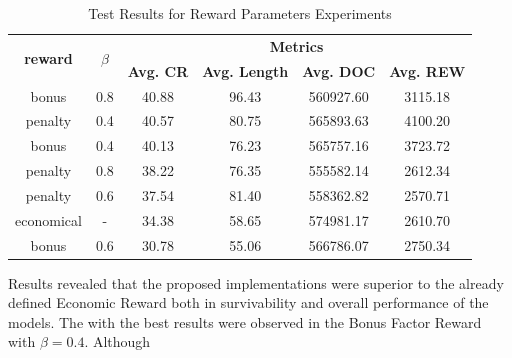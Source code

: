   \begin{table}[h!]
	\centering
	\caption{Test Results for Reward Parameters Experiments}
	\begin{tabular}{cccccc}
		\toprule
		\multirow{2}{*}{\textbf{reward}} & \multirow{2}{*}{\textbf{$\beta$}} & \multicolumn{4}{c}{\textbf{Metrics}} \\ 
		\cmidrule(lr){3-6}
		&  & \textbf{Avg. CR} & \textbf{Avg. Length} & \textbf{Avg. DOC} & \textbf{Avg. REW} \\ 
		\midrule
		bonus & 0.8 & 40.88 & 96.43 & 560927.60 & 3115.18 \\
		penalty & 0.4 & 40.57 & 80.75 & 565893.63 & 4100.20 \\
		bonus & 0.4 & 40.13 & 76.23 & 565757.16 & 3723.72  \\
		penalty & 0.8 & 38.22 & 76.35 & 555582.14 & 2612.34 \\
		penalty & 0.6 & 37.54 & 81.40 & 558362.82 & 2570.71 \\
		economical & - & 34.38 & 58.65 & 574981.17 & 2610.70 \\
		bonus & 0.6 & 30.78 & 55.06 & 566786.07 & 2750.34 \\
		\bottomrule
	\end{tabular}
	\label{tab:test-reward}
\end{table}


\par
Results revealed that the proposed implementations were superior to the already defined Economic Reward both in survivability and overall performance of the models. The with the best results were observed in the Bonus Factor Reward with $\beta = 0.4$. Although

